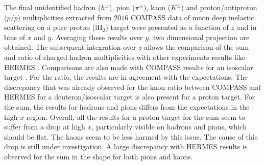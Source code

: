The final unidentified hadron ($h^{\pm}$), pion ($\pi^{\pm}$), kaon ($K^{\pm}$) and proton/antiproton ($p/\bar{p}$) multiplicities extracted from $2016$ COMPASS data of muon deep inelastic scattering on a pure proton (lH$_2$) target were presented as a function of $z$ and in bins of $x$ and $y$. Averaging these results over $y$, two dimensional projection are obtained. The subsequent integration over $z$ allows the comparison of the sum and ratio of charged hadron multiplicities with other experiments results like HERMES \cite{HERMESMult}. Comparisons are also made with COMPASS results for an isoscalar target \cite{COMPASS2006Pi,COMPASS2006K}. For the ratio, the results are in agreement with the expectations. The discrepancy that was already observed for the kaon ratio between COMPASS and HERMES for a deuteron/isoscalar target is also present for a proton target. For the sum, the results for hadrons and pions differs from the expectations in the high $x$ region. Overall, all the results for a proton target for the sum seem to suffer from a drop at high $x$, particularly visible on hadrons and pions, which should be flat. The kaons seem to be less harmed by this issue. The cause of this drop is still under investigation. A large discrepancy with HERMES results is observed for the sum in the shape for both pions and kaons.
